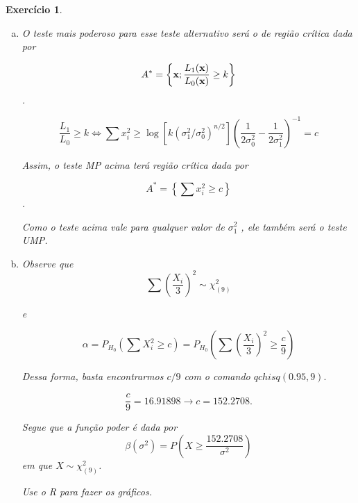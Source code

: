 \documentclass[letter,11pt]{article}
\newtheorem{exer}{Exercício}
\begin{document}
\begin{exer} \rm %

\begin{enumerate}[a)]
\item %
O teste mais poderoso para esse teste alternativo será o de região crítica dada por

\[A^*=\left\{{\bf x};\frac{L_1({\bf x})}{L_0({\bf x})}\geq k\right\}\].

\[\frac{L_1}{L_0}\geq k \Leftrightarrow  \sum x_i^2\geq \log\left[k(\sigma_1^2/\sigma_0^2)^{n/2}\right]\left(\frac{1}{2\sigma_0^2}-\frac{1}{2\sigma_1^2}\right)^{-1}=c \]

Assim, o teste MP acima terá região crítica dada por 

\[A^*=\left\{\sum x_i ^2 \geq c\right\}\].

Como o teste acima vale para qualquer valor de $\sigma_1^2$ , ele  também será o teste UMP. 



\item %
 
 Observe que \[\sum \left(\frac{X_i}{3}\right)^2\sim\chi^2_{(9)}\]
 
 e 
 
 \[\alpha = P_{H_0}\left(\sum X_i^2 \geq c\right)=P_{H_0}\left( \sum\left(\frac{X_i}{3}\right)^2\geq \frac{c}{9}\right)\]
 
 Dessa forma, basta encontrarmos $c/9$ com o comando  $qchisq(0.95,9).$

 \[\frac{c}{9}=16.91898 \rightarrow c=152.2708.\]
 
 Segue que  a função poder é dada por \[\beta(\sigma^2)=P\left(X\geq \frac{152.2708}{\sigma^2}\right)\]
 em que $X\sim\chi^2_{(9)}$.
 
 Use o R para fazer os gráficos. 
 \end{enumerate}
\end{exer}
\end{document}
